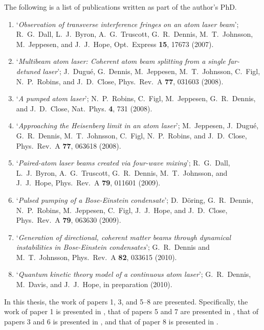 \parasep

The following is a list of publications written as part of the author's PhD.
\begin{enumerate}
    \item `\emph{Observation of transverse interference fringes on an atom laser beam}'; R.~G.~Dall, L.~J.~Byron, A.~G.~Truscott, G.~R.~Dennis, M.~T.~Johnsson, M.~Jeppesen, and J.~J.~Hope, Opt.~Express \textbf{15}, 17673 (2007).
    \item `\emph{Multibeam atom laser: Coherent atom beam splitting from a single far-detuned laser}'; J.~Dugué, G.~Dennis, M.~Jeppesen, M.~T.~Johnsson, C.~Figl, N.~P.~Robins, and J.~D.~Close, Phys.~Rev.~A \textbf{77}, 031603 (2008).
    \item `\emph{A pumped atom laser}'; N.~P.~Robins, C.~Figl, M.~Jeppesen, G.~R.~Dennis, and J.~D.~Close, Nat.~Phys. \textbf{4}, 731 (2008).
    \item `\emph{Approaching the Heisenberg limit in an atom laser}'; M.~Jeppesen, J.~Dugué, G.~R.~Dennis, M.~T.~Johnsson, C.~Figl, N.~P.~Robins, and J.~D.~Close, Phys.~Rev.~A \textbf{77}, 063618 (2008).
    \item `\emph{Paired-atom laser beams created via four-wave mixing}'; R.~G.~Dall, L.~J.~Byron, A.~G.~Truscott, G.~R.~Dennis, M.~T.~Johnsson, and J.~J.~Hope, Phys.~Rev.~A \textbf{79}, 011601 (2009).
    \item `\emph{Pulsed pumping of a Bose-Einstein condensate}'; D.~Döring, G.~R.~Dennis, N.~P.~Robins, M.~Jeppesen, C.~Figl, J.~J.~Hope, and J.~D.~Close, Phys.~Rev.~A \textbf{79}, 063630 (2009).
    \item `\emph{Generation of directional, coherent matter beams through dynamical instabilities in Bose-Einstein condensates}'; G.~R.~Dennis and M.~T.~Johnsson, Phys.~Rev.~A \textbf{82}, 033615 (2010).
    \item `\emph{Quantum kinetic theory model of a continuous atom laser}'; G.~R.~Dennis, M.~Davis, and J.~J.~Hope, in preparation (2010).
\end{enumerate}
In this thesis, the work of papers 1, 3, and 5--8 are presented.  Specifically, the work of paper 1 is presented in , that of papers 5 and 7 are presented in , that of papers 3 and 6 is presented in , and that of paper 8 is presented in .

